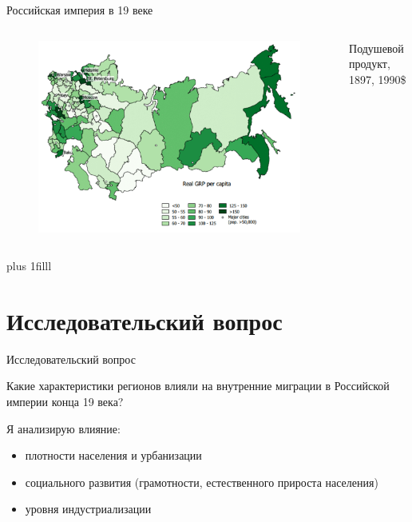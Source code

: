 \documentclass[aspectratio=169]{beamer}
\newcommand{\btVFill}{\vskip0pt plus 1filll}
\begin{document}
\begin{frame}{Российская империя в 19 веке}

\begin{columns}
	\begin{column}{0.58\textwidth}
	    \begin{figure}
		    \includegraphics[width=1.05\textwidth]{markevich.png}
	    \end{figure}
	\end{column}
	
	\begin{column}{0.38\textwidth}
	    \begin{table}[h]
	        \caption{Подушевой продукт, 1897, 1990\$}
	        \newcommand{\tableecowidth}{\textwidth}
	        
        \end{table}
	\end{column}
\end{columns}

\btVFill
\cite{markevich_regional_2019}
\bigskip

\end{frame}

\section{Исследовательский вопрос}
\begin{frame}{Исследовательский вопрос}

Какие характеристики регионов влияли на внутренние миграции в Российской империи конца 19 века?
\par
Я анализирую влияние:
\begin{itemize}
	\item плотности населения и урбанизации
	\item социального развития (грамотности, естественного прироста населения)
	\item уровня индустриализации
\end{itemize}

\end{frame}
\end{document}
